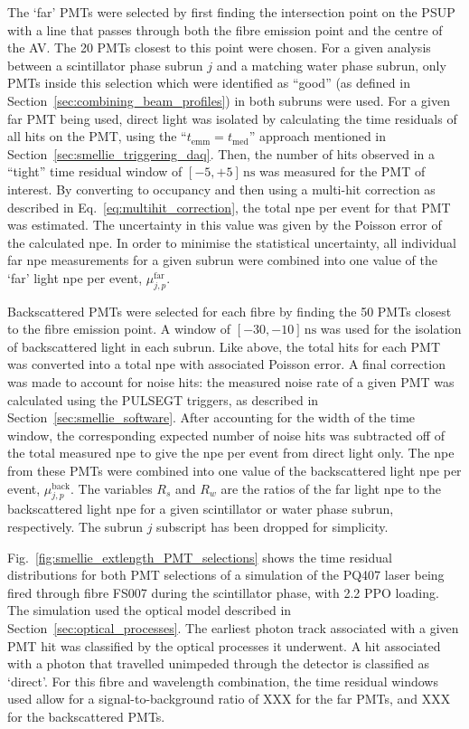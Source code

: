 The `far' PMTs were selected by first finding the intersection point on the PSUP with a line that passes through both the fibre emission point and the centre of the AV. The 20 PMTs closest to this point were chosen. For a given analysis between a scintillator phase subrun $j$ and a matching water phase subrun, only PMTs inside this selection which were identified as ``good'' (as defined in Section~\ref{sec:combining_beam_profiles}) in both subruns were used. For a given far PMT being used, direct light was isolated by calculating the time residuals of all hits on the PMT, using the ``$t_{\mathrm{emm}} = t_{\mathrm{med}}$'' approach mentioned in Section~\ref{sec:smellie_triggering_daq}. Then, the number of hits observed in a ``tight'' time residual window of $[-5,+5]\,\si{\ns}$ was measured for the PMT of interest. By converting to occupancy and then using a multi-hit correction as described in Eq.~\ref{eq:multihit_correction}, the total npe per event for that PMT was estimated. The uncertainty in this value was given by the Poisson error of the calculated npe. In order to minimise the statistical uncertainty, all individual far npe measurements for a given subrun were combined into one value of the `far' light npe per event, $\mu_{j,p}^{\mathrm{far}}$.

Backscattered PMTs were selected for each fibre by finding the 50 PMTs closest to the fibre emission point. A \tres{} window of $[-30,-10]\,\si{\ns}$ was used for the isolation of backscattered light in each subrun. Like above, the total hits for each PMT was converted into a total npe with associated Poisson error. A final correction was made to account for noise hits: the measured noise rate of a given PMT was calculated using the PULSEGT triggers, as described in Section~\ref{sec:smellie_software}. After accounting for the width of the time window, the corresponding expected number of noise hits was subtracted off of the total measured npe to give the npe per event from direct light only. The npe from these PMTs were combined into one value of the backscattered light npe per event, $\mu_{j,p}^{\mathrm{back}}$. The variables $R_{s}$ and $R_{w}$ are the ratios of the far light npe to the backscattered light npe for a given scintillator or water phase subrun, respectively. The subrun $j$ subscript has been dropped for simplicity.

Fig.~\ref{fig:smellie_extlength_PMT_selections} shows the time residual distributions for both PMT selections of a simulation of the PQ407 laser being fired through fibre FS007 during the scintillator phase, with \SI{2.2}{\gpl} PPO loading. The simulation used the optical model described in Section~\ref{sec:optical_processes}. The earliest photon track associated with a given PMT hit was classified by the optical processes it underwent. A hit associated with a photon that travelled unimpeded through the detector is classified as `direct'. For this fibre and wavelength combination, the time residual windows used allow for a signal-to-background ratio of XXX for the far PMTs, and XXX for the backscattered PMTs. %

